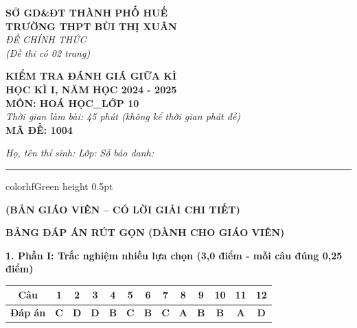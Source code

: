 \documentclass[11pt,a4paper]{article}
\begin{document}
\begin{minipage}[t]{0.48\textwidth}
\textbf{SỞ GD\&ĐT THÀNH PHỐ HUẾ}\\
\textbf{TRƯỜNG THPT BÙI THỊ XUÂN}\\
\textit{ĐỀ CHÍNH THỨC}\\
\textit{(Đề thi có 02 trang)}
\end{minipage}
\hfill
\begin{minipage}[t]{0.48\textwidth}
\raggedleft
\textbf{\color{hfRed}KIỂM TRA ĐÁNH GIÁ GIỮA KÌ}\\
\textbf{HỌC KÌ I, NĂM HỌC 2024 - 2025}\\
\textbf{MÔN: HOÁ HỌC\_LỚP 10}\\
\textit{Thời gian làm bài: 45 phút (không kể thời gian phát đề)}\\
\textbf{MÃ ĐỀ: 1004}
\end{minipage}

\vspace{4pt}
\noindent
\textit{Họ, tên thí sinh:} \dotfill \textit{Lớp:} \dotfill \textit{Số báo danh:} \dotfill

\vspace{3pt}
\hrule color{hfGreen} height 0.5pt

\vspace{4pt}
\begin{center}
\textbf{\color{hfRed}\large (BẢN GIÁO VIÊN -- CÓ LỜI GIẢI CHI TIẾT)}
\end{center}

\vspace{2pt}
\noindent
\textbf{\color{hfRed}\large BẢNG ĐÁP ÁN RÚT GỌN (DÀNH CHO GIÁO VIÊN)}

\vspace{2pt}
\noindent
\textbf{\color{mainGreen}1. Phần I: Trắc nghiệm nhiều lựa chọn (3,0 điểm - mỗi câu đúng 0,25 điểm)}
\begin{center}
\renewcommand{\arraystretch}{1.2}
\begin{tabular}{|c|c|c|c|c|c|c|c|c|c|c|c|c|}
\hline
\rowcolor{tableGreen}
\textbf{Câu} & \textbf{1} & \textbf{2} & \textbf{3} & \textbf{4} & \textbf{5} & \textbf{6} & \textbf{7} & \textbf{8} & \textbf{9} & \textbf{10} & \textbf{11} & \textbf{12} \\
\hline
\textbf{Đáp án} & \textbf{\color{hfRed}C} & \textbf{\color{hfRed}D} & \textbf{\color{hfRed}D} & \textbf{\color{hfRed}B} & \textbf{\color{hfRed}C} & \textbf{\color{hfRed}B} & \textbf{\color{hfRed}C} & \textbf{\color{hfRed}A} & \textbf{\color{hfRed}B} & \textbf{\color{hfRed}B} & \textbf{\color{hfRed}A} & \textbf{\color{hfRed}D} \\
\hline
\end{tabular}
\end{center}
\end{document}
